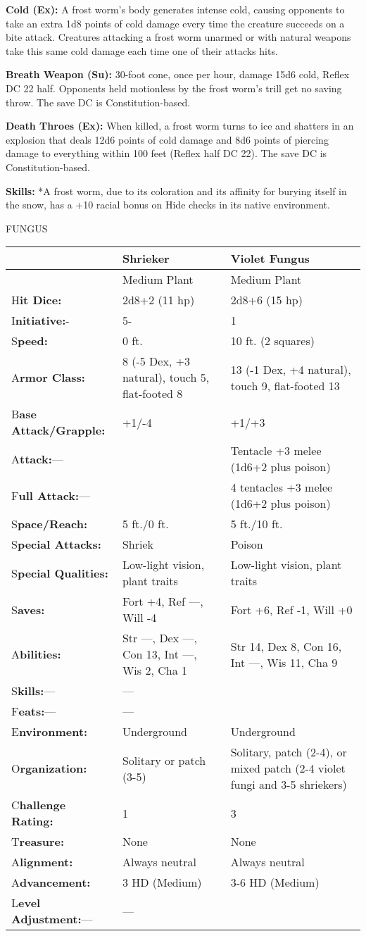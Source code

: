 \documentclass{article}
\begin{document}
\textbf{Cold (Ex):} A frost worm's body generates intense cold, causing opponents 
to take an extra 1d8 points of cold damage every time the creature succeeds on 
a bite attack. Creatures attacking a frost worm unarmed or with natural weapons 
take this same cold damage each time one of their attacks hits.

\textbf{Breath Weapon (Su):} 30-foot cone, once per hour, damage 15d6 cold, Reflex 
DC 22 half. Opponents held motionless by the frost worm's trill get no saving throw. 
The save DC is Constitution-based. 

\textbf{Death Throes (Ex): }When killed, a frost worm turns to ice and shatters 
in an explosion that deals 12d6 points of cold damage and 8d6 points of piercing 
damage to everything within 100 feet (Reflex half DC 22). The save DC is Constitution-based. 

\textbf{Skills:} *A frost worm, due to its coloration and its affinity for burying 
itself in the snow, has a +10 racial bonus on Hide checks in its native environment.

\vspace{12pt}
{\LARGE{}FUNGUS}

\begin{tabular}{|>{\raggedright}p{58pt}|>{\raggedright}p{127pt}|>{\raggedright}p{127pt}|}
\hline
 & S\textbf{hrieker} & V\textbf{iolet Fungus}\tabularnewline
\hline
  & Medium Plant & Medium Plant\tabularnewline
\hline
H\textbf{it Dice:} & 2d8+2 (11 hp) & 2d8+6 (15 hp)\tabularnewline
\hline
I\textbf{nitiative:}- & 5- & 1\tabularnewline
\hline
S\textbf{peed:} & 0 ft. & 10 ft. (2 squares)\tabularnewline
\hline
A\textbf{rmor Class:} & 8 (-5 Dex, +3 natural), touch 5, flat-footed 8 & 13 (-1 
Dex, +4 natural), touch 9, flat-footed 13\tabularnewline
\hline
B\textbf{ase Attack/Grapple:} & +1/-4 & +1/+3\tabularnewline
\hline
A\textbf{ttack:}--- &  & Tentacle +3 melee (1d6+2 plus poison)\tabularnewline
\hline
F\textbf{ull Attack:}--- &  & 4 tentacles +3 melee (1d6+2 plus poison)\tabularnewline
\hline
S\textbf{pace/Reach:} & 5 ft./0 ft. & 5 ft./10 ft.\tabularnewline
\hline
S\textbf{pecial Attacks:} & Shriek & Poison\tabularnewline
\hline
S\textbf{pecial Qualities:} & Low-light vision, plant traits & Low-light vision, 
plant traits\tabularnewline
\hline
S\textbf{aves:} & Fort +4, Ref ---, Will -4 & Fort +6, Ref -1, Will +0\tabularnewline
\hline
A\textbf{bilities:} & Str ---, Dex ---, Con 13, Int ---, Wis 2, Cha 1 & Str 14, 
Dex 8, Con 16, Int ---, Wis 11, Cha 9\tabularnewline
\hline
S\textbf{kills:}--- & --- & \tabularnewline
\hline
F\textbf{eats:}--- & --- & \tabularnewline
\hline
E\textbf{nvironment:} & Underground & Underground\tabularnewline
\hline
O\textbf{rganization:} & Solitary or patch (3-5) & Solitary, patch (2-4), or mixed 
patch (2-4 violet fungi and 3-5 shriekers)\tabularnewline
\hline
C\textbf{hallenge Rating:} & 1 & 3\tabularnewline
\hline
T\textbf{reasure:} & None & None\tabularnewline
\hline
A\textbf{lignment:} & Always neutral & Always neutral\tabularnewline
\hline
A\textbf{dvancement:} & 3 HD (Medium) & 3-6 HD (Medium)\tabularnewline
\hline
L\textbf{evel Adjustment:}--- & --- & \tabularnewline
\hline
\end{tabular}
\end{document}
